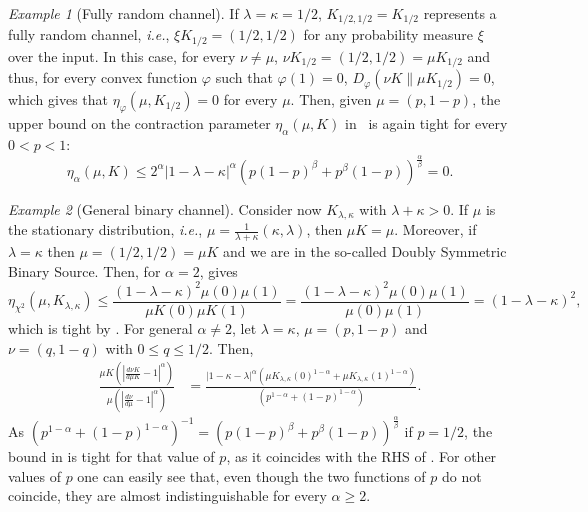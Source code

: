 \documentclass[11pt]{article}
\theoremstyle{plain}
\theoremstyle{remark}
\newtheorem{example}{Example}
\begin{document}
   \begin{example}[Fully random channel]
      If $\lambda=\kappa=1/2$, $K_{1/2,1/2}=K_{1/2}$ represents a fully random channel, \textit{i.e.}, $\xi K_{1/2}= (1/2,1/2)$ for any probability measure $\xi$ over the input. In this case, for every $\nu \neq \mu$, $\nu K_{1/2} = (1/2,1/2) = \mu K_{1/2}$ and thus, for every convex function $\varphi$ such that $\varphi(1)=0$, $D_\varphi(\nu K\|\mu K_{1/2})=0$, which gives that $\eta_{\varphi}(\mu,K_{1/2})=0$ for every $\mu$. %
      Then, given $\mu=(p,1-p)$, the upper bound on the contraction parameter $\eta_{\alpha}(\mu,K)$ in~ is again tight for every $0<p<1$:
     \begin{equation}
        \eta_{\alpha}(\mu,K) \leq 2^\alpha |1-\lambda-\kappa|^\alpha (p(1-p)^\beta+p^\beta(1-p))^\frac{\alpha}{\beta}  = 0.\label{eq:HalphaBSC}
    \end{equation}
   \end{example}
   \begin{example}[General binary channel]\label{ex:DSBS}
   Consider now $K_{\lambda,\kappa}$ with $\lambda+\kappa>0$. If $\mu$ is the stationary distribution, \textit{i.e.}, $\mu=\frac{1}{\lambda+\kappa}
(\kappa,\lambda)$, then $\mu K= \mu$. Moreover, if $\lambda=\kappa$ then $\mu=(1/2,1/2)=\mu K$ and we are in the so-called Doubly Symmetric Binary Source.
       Then, for $\alpha=2$,  gives %
    \begin{equation}
        \eta_{\chi^2}(\mu,K_{\lambda,\kappa}) \leq \frac{(1-\lambda-\kappa)^2 \mu(0)\mu(1)}{\mu K(0)\mu K(1)} = \frac{(1-\lambda-\kappa)^2 \mu(0)\mu(1)}{\mu(0)\mu(1)} = (1-\lambda-\kappa)^2,
    \end{equation}
    which is tight by \cite[Remark 3.4]{sdpiRaginsky}.  
    For general $\alpha\neq 2$, let $\lambda=\kappa$, $\mu=(p,1-p)$ 
    and $\nu=(q,1-q)$ with $0\leq q \leq 1/2$. Then, \begin{align}\label{eq:bdnew}
    \frac{\mu K\left(\left|\frac{d\nu K}{d\mu K}-1\right|^\alpha\right)}{\mu \left(\left|\frac{d\nu }{d\mu }-1\right|^\alpha\right)} 
    &= \frac{|1-\kappa-\lambda|^\alpha \left(\mu K_{\lambda,\kappa}(0)^{1-\alpha}+\mu K_{\lambda,\kappa}(1)^{1-\alpha}\right)}{(p^{1-\alpha}+(1-p)^{1-\alpha})}.
    \end{align}
    As $(p^{1-\alpha}+(1-p)^{1-\alpha})^{-1} = (p(1-p)^\beta+p^\beta(1-p))^\frac{\alpha}{\beta}$ if $p=1/2$, the bound in  is tight for that value of $p$, as it coincides with the RHS of . For other values of $p$ one can easily see that, even though the two functions of $p$ do not coincide, they are almost indistinguishable for every $\alpha\geq 2$.
   \end{example} \fi
\end{document}
